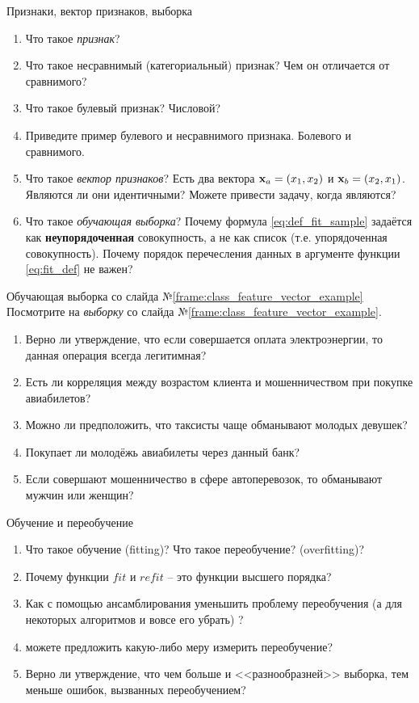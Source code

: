 \documentclass{beamer}
\newcommand{\term}{\textit}
\begin{document}
   \begin{frame}{Признаки, вектор признаков, выборка}
   \begin{enumerate}
   	\item Что такое \term{признак}?
   	\item Что такое несравнимый (категориальный) признак? Чем он отличается от сравнимого?
   	\item Что такое булевый признак? Числовой?
   	\item Приведите пример булевого и несравнимого признака. Болевого и сравнимого. 
   	\item Что такое \term{вектор признаков}? Есть два вектора $\bold x_a = (x_1, x_2)$ и $\bold x_b = (x_2, x_1)$.
   	Являются ли они идентичными? Можете привести задачу, когда являются?
   	\item Что такое \term{обучающая выборка}? Почему формула \eqref{eq:def_fit_sample} задаётся
   	как \textbf{неупорядоченная} совокупность, а не как список (т.е. упорядоченная совокупность).
   	Почему порядок перечесления данных в аргументе функции \eqref{eq:fit_def} не важен?
   \end{enumerate}
	\end{frame}

   \begin{frame}{Обучающая выборка со слайда №\ref{frame:class_feature_vector_example}}
 	Посмотрите на \term{выборку} со слайда №\ref{frame:class_feature_vector_example}. 
 	\begin{enumerate}
 	\item Верно ли утверждение, что если совершается оплата электроэнергии, то данная операция всегда легитимная?
 	\item Есть ли корреляция между возрастом клиента и мошенничеством при покупке авиабилетов? 
 	\item Можно ли предположить, что таксисты чаще обманывают молодых девушек? 
 	\item Покупает ли молодёжь авиабилеты через данный банк? 
 	\item Если совершают мошенничество в сфере автоперевозок, то обманывают мужчин или женщин?
	\end{enumerate}
	\end{frame}
  
  	\begin{frame}{Обучение и переобучение}
  		\begin{enumerate}
  			\item Что такое обучение (fitting)? Что такое переобучение? (overfitting)?
  			\item Почему функции $fit$ и $refit$ -- это функции высшего порядка?
  			\item Как с помощью ансамблирования уменьшить проблему переобучения (а для некоторых алгоритмов и вовсе его убрать) ?
  			\item можете предложить какую-либо меру измерить переобучение?
  			\item Верно ли утверждение, что чем больше и <<разнообразней>> выборка, тем меньше ошибок, вызванных переобучением?
  		\end{enumerate} 
	\end{frame}
  	
\end{document}
